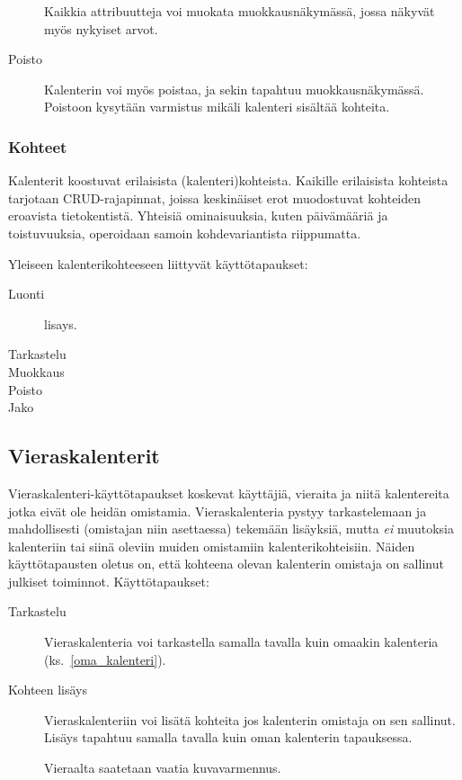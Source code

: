 \documentclass[a4paper,12pt]{report}
\begin{document}
\begin{description}
      Kaikkia attribuutteja voi muokata muokkaus\-näkymässä, jossa näkyvät myös
      nykyiset arvot.
   \item[Poisto]  Kalenterin voi myös poistaa, ja sekin tapahtuu
      muokkausnäkymässä.  Poistoon kysytään varmistus mikäli kalenteri sisältää
      kohteita.
\end{description}


\subsubsection{Kohteet}
Kalenterit koostuvat erilaisista (kalenteri)kohteista.  Kaikille erilaisista
kohteista tarjotaan CRUD-rajapinnat, joissa keskinäiset erot muodostuvat
kohteiden eroavista tietokentistä.  Yhteisiä ominaisuuksia, kuten päivämääriä ja
toistuvuuksia, operoidaan samoin kohdevariantista riippumatta.

Yleiseen kalenterikohteeseen liittyvät käyttötapaukset:
\begin{description}
   \item[Luonti] lisays.
   \item[Tarkastelu]
   \item[Muokkaus]
   \item[Poisto]
   \item[Jako]
\end{description}

\subsection{Vieraskalenterit}
Vieraskalenteri-käyttötapaukset koskevat käyttäjiä, vieraita ja niitä
kalentereita jotka eivät ole heidän omistamia.  Vieraskalenteria pystyy
tarkastelemaan ja mahdollisesti (omistajan niin asettaessa) tekemään lisäyksiä,
mutta \emph{ei} muutoksia kalenteriin tai siinä oleviin muiden omistamiin
kalenterikohteisiin.  Näiden käyttötapausten oletus on, että kohteena olevan
kalenterin omistaja on sallinut julkiset toiminnot.  Käyttötapaukset:
\begin{description}
   \item[Tarkastelu] Vieraskalenteria voi tarkastella samalla tavalla kuin
      omaakin kalenteria (ks.~\ref{oma_kalenteri}).
   \item[Kohteen lisäys]  Vieraskalenteriin voi lisätä kohteita jos kalenterin
      omistaja on sen sallinut.  Lisäys tapahtuu samalla tavalla kuin oman
      kalenterin tapauksessa. 

      Vieraalta saatetaan vaatia kuvavarmennus.
\end{description}
\end{document}
